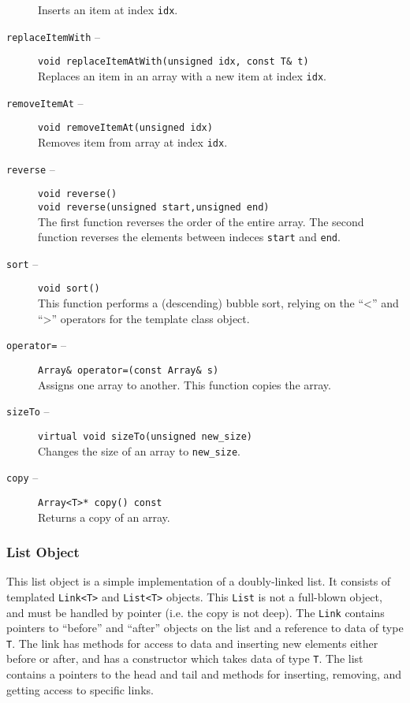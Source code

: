 \begin{description}
Inserts an item at index {\tt idx}.
\item[{\tt replaceItemWith} --]
{\tt void replaceItemAtWith(unsigned idx, const T\& t)}\\
Replaces an item in an array with a new item at index {\tt idx}.
\item[{\tt removeItemAt} --]
{\tt void removeItemAt(unsigned idx)}\\
Removes item from array at index {\tt idx}.
\item[{\tt reverse} --]
{\tt void reverse()}\\
{\tt void reverse(unsigned start,unsigned end)}\\
The first function reverses the order of the entire array.
The second function reverses the elements between indeces {\tt start}
and {\tt end}.
\item[{\tt sort} --]
{\tt void sort()}\\
This function performs a (descending) bubble sort, relying on the 
``<'' and ``>'' operators for the template class object.
\item[{\tt operator=} --]
{\tt Array\& operator=(const Array\& s)}\\
Assigns one array to another.  This function  copies
the array.
\item[{\tt sizeTo} --]
{\tt virtual void sizeTo(unsigned new\_size)}\\
Changes the size of an array to {\tt new\_size}.
\item[{\tt copy} --]
{\tt Array<T>* copy() const}\\
Returns a copy of an array.
\end{description}  

\subsubsection{List Object}
\label{ul_lo}
This list object is a simple implementation of a doubly-linked list.  
It consists of templated {\tt Link<T>} and {\tt List<T>} objects.
This {\tt List} is not a full-blown object, and must be handled by 
pointer (i.e. the copy is not deep).  The {\tt Link} contains pointers 
to ``before'' and ``after'' objects on the list and a reference to 
data of type {\tt T}.  The link has methods for access to data and 
inserting new elements either before or after, and has a constructor 
which takes data of type {\tt T}.
The list contains a pointers to the head and tail and methods for 
inserting, removing, and getting access to specific links.

